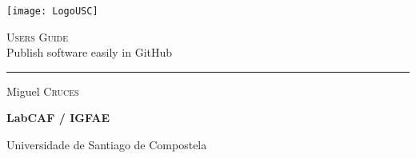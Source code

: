 
\begin{centering}
    \begin{minipage}[c]{0.4\linewidth}
        \centering
    \texttt{[image: LogoUSC]}
    \end{minipage}
    
    	\vspace{1.5cm}
        {\huge \textsc{Users Guide} \\ Publish software easily in \textsf{GitHub}\par}
    	\vspace{0.25cm}
    
    	
    	\noindent\rule{\textwidth}{1pt}
    	\vspace{0.5cm}
        
        Miguel \textsc{Cruces}
    	
    	\vspace{0.5cm}
    	{\large\bfseries LabCAF / IGFAE  \par Universidade de Santiago de Compostela}
    
    	\vspace{1cm}
\end{centering}
